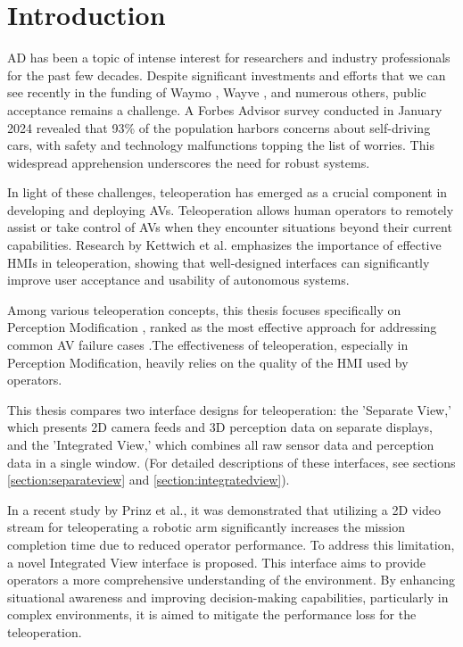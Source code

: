 
\chapter{Introduction}\label{chapter:introduction}

\ac{AD} has been a topic of intense interest for researchers and
industry professionals for the past few decades. Despite significant investments and
efforts that we can see recently in the funding of Waymo \cite{waymo2024funding}, Wayve \cite{wayve2024funding},
and numerous others, public acceptance remains a challenge. A Forbes Advisor
survey \cite{forbes2024} conducted in January 2024 revealed that 93\% of the population harbors
concerns about self-driving cars, with safety and technology malfunctions topping the
list of worries.
This widespread apprehension underscores the need for robust systems.

In light of these challenges, teleoperation has emerged as a crucial component
in developing and deploying \acp{AV}. Teleoperation allows
human operators to remotely assist or take control of \acp{AV} when they
encounter situations beyond their current capabilities. Research by Kettwich et al. \cite{Kettwich}
emphasizes the importance of effective \acp{HMI} in
teleoperation, showing that well-designed interfaces can significantly improve user
acceptance and usability of autonomous systems.

Among various teleoperation concepts, this thesis focuses specifically on Perception Modification \cite{Feiler2021ThePM},
ranked as the most effective approach for
addressing common \ac{AV} failure cases \cite{Brecht} .The effectiveness of
teleoperation, especially in Perception Modification, heavily relies on the quality of the \ac{HMI} used by operators.

This thesis compares two interface designs for teleoperation: the 'Separate View,'
which presents 2D camera feeds and 3D perception data on separate displays, and
the 'Integrated View,' which combines all raw sensor data and perception data in a single window.
(For detailed descriptions of these interfaces, see sections \ref{section:separateview} and \ref{section:integratedview}).

In a recent study by Prinz et al.\cite{vizualizationUserStudy}, it was demonstrated that utilizing a 2D video stream for teleoperating a robotic arm
significantly increases the mission completion time due to reduced operator performance. To address this limitation,
a novel Integrated View interface is proposed. This interface aims to provide operators a more comprehensive understanding of the environment.
By enhancing situational awareness and improving decision-making capabilities, particularly in complex environments, it is aimed to mitigate the performance
loss for the teleoperation.

